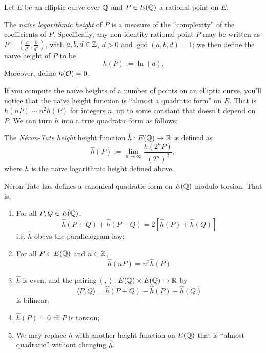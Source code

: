 Let $E$ be an elliptic curve over $\mathbb{Q}$ and $P \in E(\mathbb{Q})$ a rational point on $E$. 

\begin{definition}
The {\it na\"ive logarithmic height} of $P$ is a measure of the ``complexity'' of the coefficients of $P$. Specifically, any non-identity rational point $P$ may be written as $P = (\frac{a}{d^2},\frac{b}{d^3})$, with $a,b,d \in \mathbb{Z}$, $d>0$ and $\gcd(a,b,d) = 1$; we then define the na\"ive height of $P$ to be
\begin{equation}
	h(P) := \ln(d).
\end{equation}
Moreover, define $h(\mathcal{O}) = 0$.
\end{definition}
If you compute the na\"ive heights of a number of points on an elliptic curve, you'll notice that the na\"ive height function is ``almost a quadratic form'' on $E$. That is $h(nP) \sim n^2 h(P)$ for integers $n$, up to some constant that doesn't depend on $P$. We can turn $h$ into a true quadratic form as follows:

\begin{definition}
The {\it N\'eron-Tate height} height function $\hat{h}: E(\mathbb{Q}) \to \mathbb{R}$ is defined as
\begin{equation}
	\hat{h}(P) := \lim_{n \to \infty} \frac{h(2^n P)}{(2^n)^2},
\end{equation}
where $h$ is the na\"ive logarithmic height defined above.
\end{definition}

\begin{theorem}
N\'eron-Tate has defines a canonical quadratic form on $E(\mathbb{Q})$ modulo torsion. That is,
\begin{enumerate}
	\item For all $P,Q \in E(\mathbb{Q})$,
	\begin{equation}
		\hat{h}(P+Q) + \hat{h}(P-Q) = 2\left[ \hat{h}(P) + \hat{h}(Q)\right]
	\end{equation}
	i.e. $\hat{h}$ obeys the parallelogram law;
	\item For all $P \in E(\mathbb{Q})$ and $n \in \mathbb{Z}$,
	\begin{equation}
		\hat{h}(nP) = n^2 \hat{h}(P)
	\end{equation}
	\item $\hat{h}$ is even, and the pairing $\langle\;,\;\rangle: E(\mathbb{Q})\times E(\mathbb{Q}) \to \mathbb{R}$ by
	\begin{equation}
		\langle P,Q \rangle = \hat{h}(P+Q) - \hat{h}(P) - \hat{h}(Q)
	\end{equation}
	is bilinear;
	\item $\hat{h}(P) = 0$ iff $P$ is torsion;
	\item We may replace $h$ with another height function on $E(\mathbb{Q})$ that is ``almost quadratic'' without changing $\hat{h}$.
\end{enumerate}
\end{theorem}

